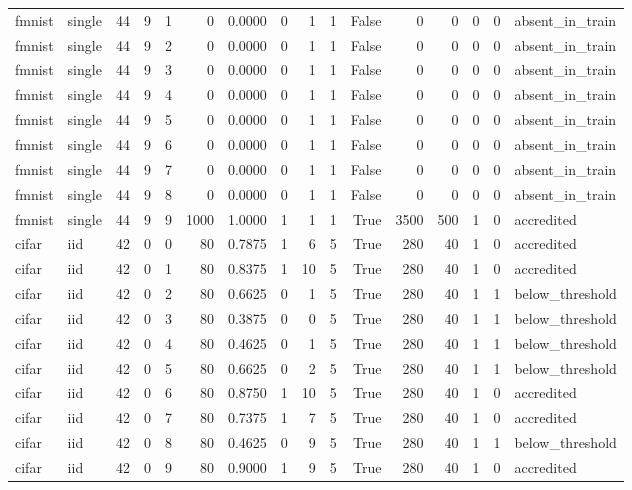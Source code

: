 \begin{tabular}{llrrrrrrrrrrrrrl}
fmnist & single & 44 & 9 & 1 & 0 & 0.0000 & 0 & 1 & 1 & False & 0 & 0 & 0 & 0 & absent\_in\_train \\
fmnist & single & 44 & 9 & 2 & 0 & 0.0000 & 0 & 1 & 1 & False & 0 & 0 & 0 & 0 & absent\_in\_train \\
fmnist & single & 44 & 9 & 3 & 0 & 0.0000 & 0 & 1 & 1 & False & 0 & 0 & 0 & 0 & absent\_in\_train \\
fmnist & single & 44 & 9 & 4 & 0 & 0.0000 & 0 & 1 & 1 & False & 0 & 0 & 0 & 0 & absent\_in\_train \\
fmnist & single & 44 & 9 & 5 & 0 & 0.0000 & 0 & 1 & 1 & False & 0 & 0 & 0 & 0 & absent\_in\_train \\
fmnist & single & 44 & 9 & 6 & 0 & 0.0000 & 0 & 1 & 1 & False & 0 & 0 & 0 & 0 & absent\_in\_train \\
fmnist & single & 44 & 9 & 7 & 0 & 0.0000 & 0 & 1 & 1 & False & 0 & 0 & 0 & 0 & absent\_in\_train \\
fmnist & single & 44 & 9 & 8 & 0 & 0.0000 & 0 & 1 & 1 & False & 0 & 0 & 0 & 0 & absent\_in\_train \\
fmnist & single & 44 & 9 & 9 & 1000 & 1.0000 & 1 & 1 & 1 & True & 3500 & 500 & 1 & 0 & accredited \\
cifar & iid & 42 & 0 & 0 & 80 & 0.7875 & 1 & 6 & 5 & True & 280 & 40 & 1 & 0 & accredited \\
cifar & iid & 42 & 0 & 1 & 80 & 0.8375 & 1 & 10 & 5 & True & 280 & 40 & 1 & 0 & accredited \\
cifar & iid & 42 & 0 & 2 & 80 & 0.6625 & 0 & 1 & 5 & True & 280 & 40 & 1 & 1 & below\_threshold \\
cifar & iid & 42 & 0 & 3 & 80 & 0.3875 & 0 & 0 & 5 & True & 280 & 40 & 1 & 1 & below\_threshold \\
cifar & iid & 42 & 0 & 4 & 80 & 0.4625 & 0 & 1 & 5 & True & 280 & 40 & 1 & 1 & below\_threshold \\
cifar & iid & 42 & 0 & 5 & 80 & 0.6625 & 0 & 2 & 5 & True & 280 & 40 & 1 & 1 & below\_threshold \\
cifar & iid & 42 & 0 & 6 & 80 & 0.8750 & 1 & 10 & 5 & True & 280 & 40 & 1 & 0 & accredited \\
cifar & iid & 42 & 0 & 7 & 80 & 0.7375 & 1 & 7 & 5 & True & 280 & 40 & 1 & 0 & accredited \\
cifar & iid & 42 & 0 & 8 & 80 & 0.4625 & 0 & 9 & 5 & True & 280 & 40 & 1 & 1 & below\_threshold \\
cifar & iid & 42 & 0 & 9 & 80 & 0.9000 & 1 & 9 & 5 & True & 280 & 40 & 1 & 0 & accredited \\

\end{tabular}

